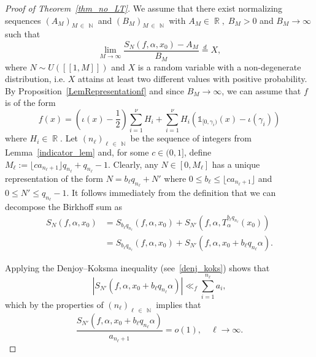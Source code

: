 \documentclass[AHL,Unicode,longabstracts,published]{cedram}
\DeclareMathOperator{\R}{\mathbb{R}}
\DeclareMathOperator{\N}{\mathbb{N}}
\newcommand{\kj}{n_{\ell}}
\begin{document}
\begin{proof}[Proof of Theorem~\ref{thm_no_LT}]
We assume that there exist normalizing sequences $(A_M)_{M\,\in\,\N}$ and $(B_M)_{M\,\in\,\N}$ with $A_M \in \R, \; B_M > 0$ and $ B_M \to \infty$ such that
\begin{equation}\label{LiminDist}
\lim_{M \rightarrow \infty} \frac{S_N(f, \alpha, x_0) - A_M}{B_M} \stackrel{d}{=} X,
\end{equation}
where $N \sim U([\![1,M]\!])$ and $X$ is a random variable with a non-degenerate distribution, i.e. $X$ attains at least two different values with positive probability. By Proposition~\ref{LemRepresentationf} and since $B_M \to \infty$, we can assume that $f$ is of the form
\[
f(x) = \left (\iota(x) - \frac{1}{2} \right) \sum_{i=1}^{\nu} H_i + \sum_{i=1}^{\nu}H_i \left(\mathds{1}_{[0, \gamma_i)}(x) -\iota(\gamma_i) \right)
\]
where $H_i \in \R$. Let $(n_\ell)_{\ell\,\in\,\N}$ be the sequence of integers from Lemma~\ref{indicator_lem} and, for some $c \in (0,1]$, define $M_{\ell} := \lfloor ca_{n_{\ell} +1} \rfloor q_{n_{\ell}} + q_{\kj}-1$. Clearly, any $N \in [0,M_{\ell}]$ has a unique representation of the form $N = b_{\ell}q_{n_{\ell}} +N' $ where $0 \leq b_{\ell} \leq \lfloor ca_{n_{\ell}+1}\rfloor $ and $0 \leq N' \leq q_{n_{\ell}}-1$. It follows immediately from the definition that we can decompose the Birkhoff sum as
\begin{align*}
S_N(f,\alpha,x_0) &= S_{b_{\ell}q_{n_\ell}}(f,\alpha,x_0) +S_{N'}\left(f, \alpha, T_{\alpha}^{b_\ell q_{n_{\ell}}}(x_0)\right)
\\&= S_{b_{\ell}q_{n_\ell}}(f,\alpha,x_0) + S_{N'}(f, \alpha, x_0 + b_\ell q_{n_{\ell}} \alpha).
\end{align*}

Applying the Denjoy--Koksma inequality (see~\eqref{denj_koks}) shows that
\begin{equation*}
\left| S_{N'}(f, \alpha, x_0 + b_\ell q_{n_{\ell}} \alpha)\right|
\ll_f \sum_{i = 1}^{n_{\ell}} a_i,
\end{equation*}
which by the properties of $(\kj)_{\ell \,\in\,\N}$ implies that
\begin{equation}\label{Eq_Error_est}
\frac{S_{N'}(f, \alpha, x_0 + b_\ell q_{n_{\ell}} \alpha) }{a_{\kj +1}} = o(1), \quad \ell \to \infty.
\end{equation}


\end{proof}
\end{document}

